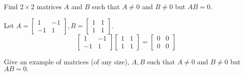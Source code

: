 \documentclass{ximera}
\begin{document}
\begin{problem}\label{prb:4.18} Find $2 \times 2$ matrices $A$ and $B$ such that $A \neq 0$ and $B \neq 0$ but $AB = 0$.
\begin{hint}
Let $A = \left[
\begin{array}{rr}
1 & -1 \\
-1 & 1
\end{array}
\right], B = \left[
\begin{array}{cc}
1 & 1 \\
1 & 1
\end{array}
\right].$
\[
\left[
\begin{array}{rr}
1 & -1 \\
-1 & 1
\end{array}
\right] \left[
\begin{array}{cc}
1 & 1 \\
1 & 1
\end{array}
\right] = \left[
\begin{array}{cc}
0 & 0 \\
0 & 0
\end{array}
\right]
\]
\end{hint}
\end{problem}

\begin{problem}\label{prb:4.19} Give an example of matrices (of any size), $A,B$ such that $A \neq 0$ and $B \neq 0$ but  $AB=0.$
\end{problem}
\end{document}
